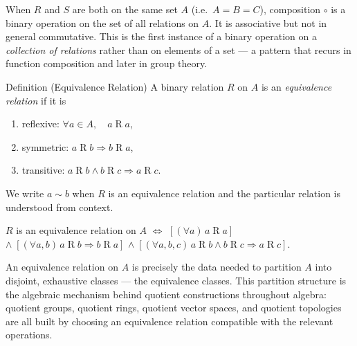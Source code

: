 \begin{remark}
When $R$ and $S$ are both on the same set $A$ (i.e.\ $A = B = C$),
composition $\circ$ is a binary operation on the set of all relations on $A$.
It is associative but not in general commutative.
This is the first instance of a binary operation on a \emph{collection of
relations} rather than on elements of a set — a pattern that recurs in
function composition and later in group theory.
\end{remark}


\begin{definitionbox}{Definition (Equivalence Relation)}
\label{def:equiv-relation}
A binary relation $R$ on $A$ is an \emph{equivalence relation} if it is
\begin{enumerate}[label=(\roman*)]
  \item reflexive: $\forall a \in A,\quad a \mathrel{R} a$,
  \item symmetric: $a \mathrel{R} b \Rightarrow b \mathrel{R} a$,
  \item transitive: $a \mathrel{R} b \land b \mathrel{R} c \Rightarrow a \mathrel{R} c$.
\end{enumerate}
We write $a \sim b$ when $R$ is an equivalence relation and the
particular relation is understood from context.
\end{definitionbox}

\begin{remark}
$R$ is an equivalence relation on $A$
$\iff$
$[(\forall a)\, a \mathrel{R} a]$
$\land\;
[(\forall a,b)\, a \mathrel{R} b \Rightarrow b \mathrel{R} a]$
$\land\;
[(\forall a,b,c)\, a \mathrel{R} b \land b \mathrel{R} c \Rightarrow a \mathrel{R} c]$.
\end{remark}

\begin{remark}
An equivalence relation on $A$ is precisely the data needed to partition
$A$ into disjoint, exhaustive classes — the equivalence classes.
This partition structure is the algebraic mechanism behind
quotient constructions throughout algebra:
quotient groups, quotient rings, quotient vector spaces, and quotient topologies
are all built by choosing an equivalence relation compatible with the relevant
operations.
\end{remark}

